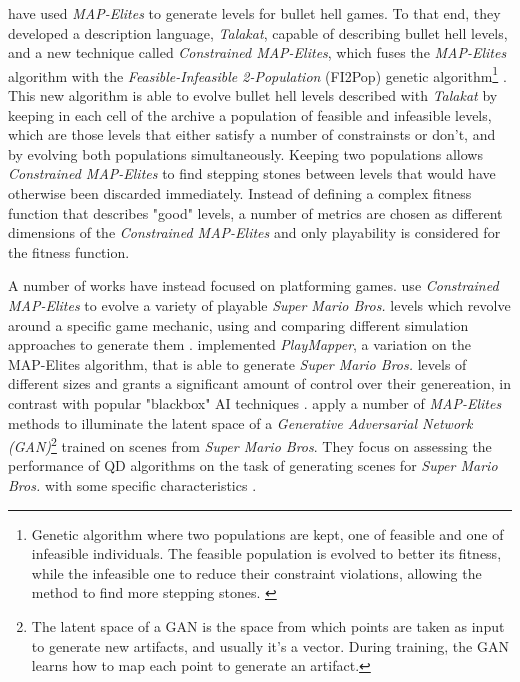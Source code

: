 \documentclass{Configuration_Files/PoliMi3i_thesis}
\begin{document}
\citeauthor{khalifa_talakat_2018} have used \textit{MAP-Elites} to generate levels for bullet hell games. To that end, they developed a description language, \textit{Talakat}, capable of describing bullet hell levels, and a new technique called \textit{Constrained MAP-Elites}, which fuses the \textit{MAP-Elites} algorithm with the \textit{Feasible-Infeasible 2-Population} (FI2Pop) genetic algorithm\footnote{Genetic algorithm where two populations are kept, one of feasible and one of infeasible individuals. The feasible population is evolved to better its fitness, while the infeasible one to reduce their constraint violations, allowing the method to find more stepping stones. \cite{kimbrough_feasibleinfeasible_2008}} \cite{kimbrough_feasibleinfeasible_2008}. This new algorithm is able to evolve bullet hell levels described with \textit{Talakat} by keeping in each cell of the archive a population of feasible and infeasible levels, which are those levels that either satisfy a number of constrainsts or don't, and by evolving both populations simultaneously. Keeping two populations allows \textit{Constrained MAP-Elites} to find stepping stones between levels that would have otherwise been discarded immediately. Instead of defining a complex fitness function that describes "good" levels, a number of metrics are chosen as different dimensions of the \textit{Constrained MAP-Elites} and only playability is considered for the fitness function. \cite{khalifa_talakat_2018}

A number of works have instead focused on platforming games.  use \textit{Constrained MAP-Elites} to evolve a variety of playable \textit{Super Mario Bros.} levels which revolve around a specific game mechanic, using and comparing different simulation approaches to generate them \cite{khalifa_intentional_2019}.  implemented \textit{PlayMapper}, a variation on the MAP-Elites algorithm, that is able to generate \textit{Super Mario Bros.} levels of different sizes and grants a significant amount of control over their genereation, in contrast with popular "blackbox" AI techniques \cite{warriar_playmapper_2019}. \citeauthor{fontaine_illuminating_2021} apply a number of \textit{MAP-Elites} methods to illuminate the latent space of a \textit{Generative Adversarial Network (GAN)}\footnote{The latent space of a GAN is the space from which points are taken as input to generate new artifacts, and usually it's a vector. During training, the GAN learns how to map each point to generate an artifact.} trained on scenes from \textit{Super Mario Bros}. They focus on assessing the performance of QD algorithms on the task of generating scenes for \textit{Super Mario Bros.} with some specific characteristics \cite{fontaine_illuminating_2021}.
\end{document}
